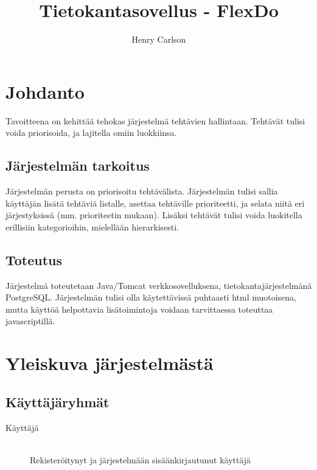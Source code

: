 ﻿\documentclass[finnish]{report}
\begin{document}
\title{Tietokantasovellus - FlexDo}
\author{Henry Carlson}
\maketitle

\tableofcontents

\chapter{Johdanto}
Tavoitteena on kehittää tehokas järjestelmä tehtävien hallintaan. Tehtävät tulisi voida priorisoida, ja lajitella omiin luokkiinsa.

\section{Järjestelmän tarkoitus}
Järjestelmän perusta on priorisoitu tehtävälista. Järjestelmän tulisi sallia käyttäjän lisätä tehtäviä listalle, asettaa tehtäville prioriteetti, ja selata niitä eri järjestyksissä (mm. prioriteetin mukaan). Lisäksi tehtävät tulisi voida luokitella erillisiin kategorioihin, mielellään hierarkisesti.

\section{Toteutus}
Järjestelmä toteutetaan Java/Tomcat verkkosovelluksena, tietokantajärjestelmänä PostgreSQL. Järjestelmän tulisi olla käytettävissä puhtaasti html muotoisena, mutta käyttöä helpottavia lisätoimintoja voidaan tarvittaessa toteuttaa javascriptillä.


\chapter{Yleiskuva järjestelmästä}

\section{Käyttäjäryhmät}
\begin{description}
  \item[Käyttäjä] \hfill \\
    Rekisteröitynyt ja järjestelmään sisäänkirjautunut käyttäjä
\end{description}
\end{document}

